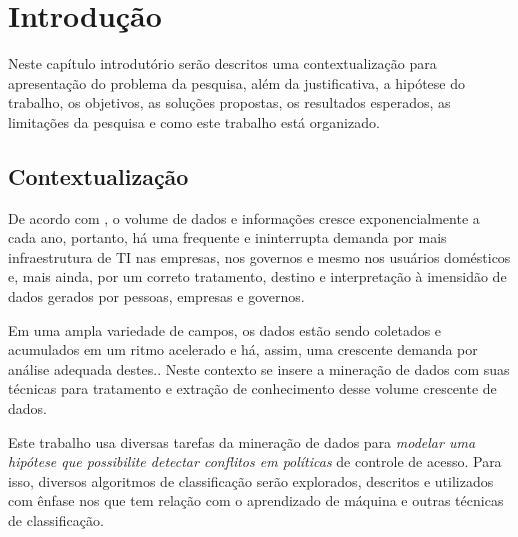 \documentclass[
	12pt,				%
	openright,			%
	oneside,			%
	a4paper,			%
	english,			%
	french,				%
	spanish,			%
	brazil				%
	]{abntex2}
\begin{document}

\tableofcontents*
\cleardoublepage


\textual

\chapter{Introdução} \label{introducao}
Neste capítulo introdutório serão descritos uma contextualização para apresentação do problema da pesquisa, além da justificativa, a hipótese do trabalho, os objetivos, as soluções propostas, os resultados esperados, as limitações da pesquisa e como este trabalho está organizado.
\section{Contextualização} \label{contextualizacao}
De acordo com , o volume de dados e informações cresce exponencialmente a cada ano, portanto, há uma frequente e ininterrupta demanda por mais infraestrutura de TI nas empresas, nos governos e mesmo nos usuários domésticos e, mais ainda, por um correto tratamento, destino e interpretação à imensidão de dados gerados por pessoas, empresas e governos\cite{machado2014}. 

Em uma ampla variedade de campos, os dados estão sendo coletados e acumulados em um ritmo acelerado e há, assim, uma crescente demanda por análise adequada destes.\cite{fayyad1996, lima_fraud_2012}. Neste contexto se insere a mineração de dados com suas técnicas para tratamento e extração de conhecimento desse volume crescente de dados\cite{Boscarioli2017, ferrari2017}.

Este trabalho usa diversas tarefas da mineração de dados para \textit{modelar uma hipótese que possibilite detectar conflitos em políticas} de controle de acesso. Para isso, diversos algoritmos de classificação serão explorados, descritos e utilizados com ênfase nos que tem relação com o aprendizado de máquina e outras técnicas de classificação.
\end{document}
